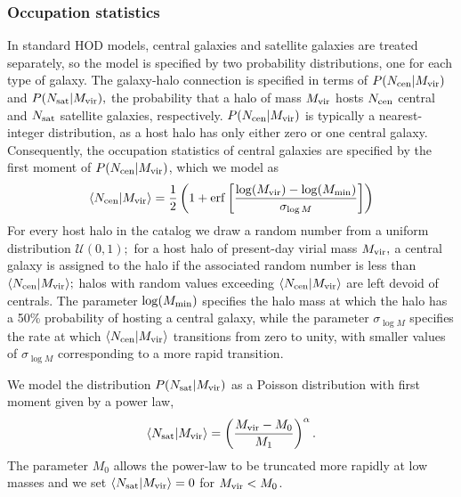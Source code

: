 \documentclass[usenatbib,usegraphicx,letterpaper]{mn2e}
\newcommand{\mvir}{M_{\rm vir}}
\newcommand{\ncen}{N_{\rm cen}}
\newcommand{\nsat}{N_{\rm sat}}
\begin{document}
\subsubsection{Occupation statistics}

In standard HOD models, central galaxies and satellite galaxies are treated separately, so
the model is specified by two probability distributions, one for each type of galaxy.
The galaxy-halo connection is specified in terms of $P(\ncen|\mvir)$ and $P(\nsat|\mvir),$
the probability that a halo of mass $\mvir$ hosts $\ncen$ central and $\nsat$ satellite galaxies,
respectively. $P(\ncen|\mvir)$ is typically a nearest-integer distribution, as a host halo has only
either zero or one central galaxy. Consequently, the occupation statistics of central galaxies are
specified by the first moment of $P(\ncen|\mvir)$, which we model as
%
\begin{equation}
\label{eq:ncen}
\langle N_{\mathrm{cen}} \vert \mvir \rangle =
        \frac{1}{2}\left( 1 +
        \mathrm{erf}\left[ \frac{\log (\mvir) -
        \log (M_{\rm min})}{\sigma_{\log M}} \right] \right)
\end{equation}
%
For every host halo in the catalog we draw a random number from a uniform 
distribution $\mathcal{U}(0, 1);$ for a host halo of present-day virial mass $\mvir,$ 
a central galaxy is assigned to the halo if the associated random number is less 
than $\langle N_{\mathrm{cen}} \vert \mvir \rangle;$ halos with random values 
exceeding  $\langle N_{\mathrm{cen}} \vert \mvir \rangle$ are left devoid of centrals.
The parameter $\log (M_{\rm min})$ specifies the halo mass at which the halo 
has a 50\% probability of hosting a
central galaxy, while the parameter $\sigma_{\log M}$ specifies the rate at 
which $\langle N_{\mathrm{cen}} \vert \mvir \rangle$
transitions from zero to unity, with smaller values of $\sigma_{\log M}$ 
corresponding to a more rapid transition.


We model the distribution $P(\nsat|\mvir)$ as a Poisson distribution with first moment given by a power law,
%
\begin{equation}
\label{eq:nsat}
\langle N_{\rm sat}\vert \mvir \rangle = \left( \frac{\mvir - M_0}{M_1} \right)^{\alpha}.
\end{equation}
%
The parameter $M_0$ allows the power-law to be truncated more rapidly at low masses and we
set $\langle N_{\rm sat}\vert \mvir \rangle = 0$ for $\mvir < M_0$.
\end{document}
